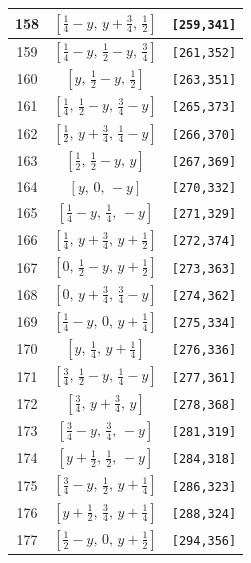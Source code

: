 \documentclass[fleqn,8pt]{jsarticle}
\begin{document}
\begin{longtable}{ccc}
158 & $\left[ \frac{1}{4} - y,\, y + \frac{3}{4},\, \frac{1}{2} \right]$ & {\tt [259,341]} \\ \hline
159 & $\left[ \frac{1}{4} - y,\, \frac{1}{2} - y,\, \frac{3}{4} \right]$ & {\tt [261,352]} \\ \hline
160 & $\left[ y,\, \frac{1}{2} - y,\, \frac{1}{2} \right]$ & {\tt [263,351]} \\ \hline
161 & $\left[ \frac{1}{4},\, \frac{1}{2} - y,\, \frac{3}{4} - y \right]$ & {\tt [265,373]} \\ \hline
162 & $\left[ \frac{1}{2},\, y + \frac{3}{4},\, \frac{1}{4} - y \right]$ & {\tt [266,370]} \\ \hline
163 & $\left[ \frac{1}{2},\, \frac{1}{2} - y,\, y \right]$ & {\tt [267,369]} \\ \hline
164 & $\left[ y,\, 0,\, - y \right]$ & {\tt [270,332]} \\ \hline
165 & $\left[ \frac{1}{4} - y,\, \frac{1}{4},\, - y \right]$ & {\tt [271,329]} \\ \hline
166 & $\left[ \frac{1}{4},\, y + \frac{3}{4},\, y + \frac{1}{2} \right]$ & {\tt [272,374]} \\ \hline
167 & $\left[ 0,\, \frac{1}{2} - y,\, y + \frac{1}{2} \right]$ & {\tt [273,363]} \\ \hline
168 & $\left[ 0,\, y + \frac{3}{4},\, \frac{3}{4} - y \right]$ & {\tt [274,362]} \\ \hline
169 & $\left[ \frac{1}{4} - y,\, 0,\, y + \frac{1}{4} \right]$ & {\tt [275,334]} \\ \hline
170 & $\left[ y,\, \frac{1}{4},\, y + \frac{1}{4} \right]$ & {\tt [276,336]} \\ \hline
171 & $\left[ \frac{3}{4},\, \frac{1}{2} - y,\, \frac{1}{4} - y \right]$ & {\tt [277,361]} \\ \hline
172 & $\left[ \frac{3}{4},\, y + \frac{3}{4},\, y \right]$ & {\tt [278,368]} \\ \hline
173 & $\left[ \frac{3}{4} - y,\, \frac{3}{4},\, - y \right]$ & {\tt [281,319]} \\ \hline
174 & $\left[ y + \frac{1}{2},\, \frac{1}{2},\, - y \right]$ & {\tt [284,318]} \\ \hline
175 & $\left[ \frac{3}{4} - y,\, \frac{1}{2},\, y + \frac{1}{4} \right]$ & {\tt [286,323]} \\ \hline
176 & $\left[ y + \frac{1}{2},\, \frac{3}{4},\, y + \frac{1}{4} \right]$ & {\tt [288,324]} \\ \hline
177 & $\left[ \frac{1}{2} - y,\, 0,\, y + \frac{1}{2} \right]$ & {\tt [294,356]} \\ \hline

\end{longtable}
\end{document}
